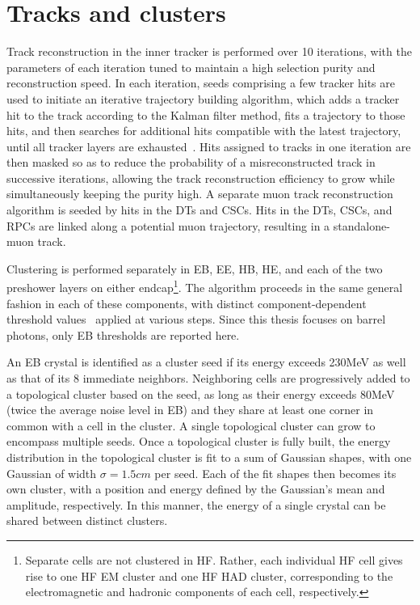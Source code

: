 \documentclass[oneside, letterpaper, 12pt, oldfontcommands]{memoir}
\begin{document}
\section{Tracks and clusters}
Track reconstruction in the inner tracker is performed over 10 iterations, with the parameters of each iteration tuned to maintain a high selection purity
and reconstruction speed. In each iteration, seeds comprising a few tracker hits are used to initiate an iterative trajectory building algorithm,
which adds a tracker hit to the track according to the Kalman filter method, fits a trajectory to those hits, and then
searches for additional hits compatible with the latest trajectory, until all tracker layers are exhausted~\cite{ref:cms_tdr_vol1}.
Hits assigned to tracks in one iteration are then masked so as to reduce the probability of a misreconstructed track in successive
iterations, allowing the track reconstruction efficiency to grow while simultaneously keeping the purity high.
A separate muon track reconstruction algorithm is seeded by hits in the DTs and CSCs. Hits in the DTs, CSCs, and RPCs are linked along a potential muon trajectory,
resulting in a standalone-muon track.

Clustering is performed separately in EB, EE, HB, HE, and each of the two preshower layers on either endcap\footnote{Separate cells are not clustered in HF.
Rather, each individual HF cell gives rise to one HF EM cluster and one HF HAD cluster, corresponding
to the electromagnetic and hadronic components of each cell, respectively.}. The algorithm proceeds in the same general
fashion in each of these components, with distinct component-dependent threshold values~\cite{ref:1748-0221/12/10/P10003} applied at various steps.
Since this thesis focuses on barrel photons, only EB thresholds are reported here.

An EB crystal is identified as a cluster seed if its energy exceeds 230\unit{MeV} as well as that of its 8 immediate neighbors. Neighboring cells
are progressively added to a topological cluster based on the seed, as long as their energy exceeds 80\unit{MeV} (twice the average noise level in EB)
and they share at least one corner in common with a cell in the cluster. A single topological cluster can grow to encompass multiple seeds.
Once a topological cluster is fully built, the energy distribution in the topological cluster is fit to a sum of Gaussian shapes,
with one Gaussian of width $\sigma = 1.5\unit{cm}$ per seed. Each of the fit shapes then becomes its own cluster, with a position and energy defined by the Gaussian's
mean and amplitude, respectively. In this manner, the energy of a single crystal can be shared between distinct clusters.
\end{document}
